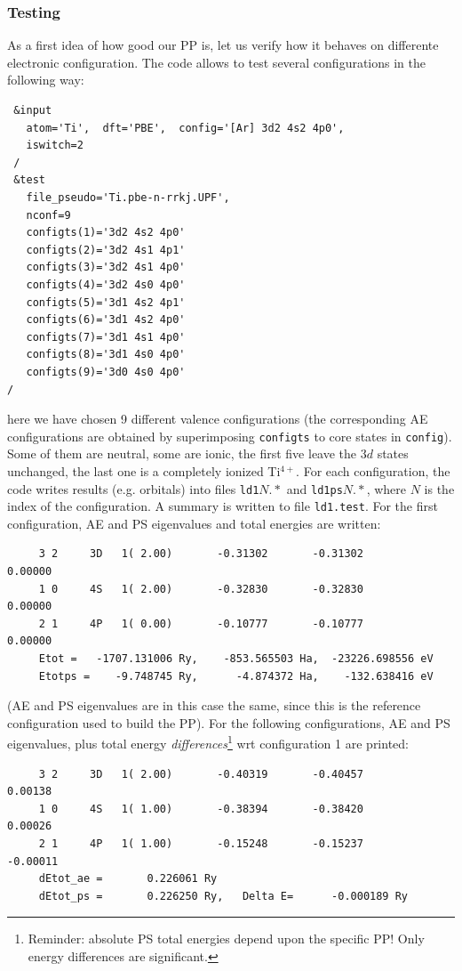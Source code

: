 \documentclass[12pt,a4paper]{article}
\begin{document}
\subsubsection{Testing}

As a first idea of how good our PP is, let us verify how it
behaves on differente electronic configuration. The code
allows to test several configurations in the following way:
\begin{verbatim}
 &input
   atom='Ti',  dft='PBE',  config='[Ar] 3d2 4s2 4p0',
   iswitch=2
 /
 &test
   file_pseudo='Ti.pbe-n-rrkj.UPF',
   nconf=9
   configts(1)='3d2 4s2 4p0'
   configts(2)='3d2 4s1 4p1'
   configts(3)='3d2 4s1 4p0'
   configts(4)='3d2 4s0 4p0'
   configts(5)='3d1 4s2 4p1'
   configts(6)='3d1 4s2 4p0'
   configts(7)='3d1 4s1 4p0'
   configts(8)='3d1 4s0 4p0'
   configts(9)='3d0 4s0 4p0'
/
\end{verbatim}
here we have chosen 9 different valence configurations 
(the corresponding AE configurations are obtained by 
superimposing \texttt{configts} to core states in \texttt{config}).
Some of them are neutral, some are ionic, the first five leave
the $3d$ states unchanged, the last one is a completely ionized
Ti$^{4+}$. For each configuration, the code writes results 
(e.g. orbitals) into files \texttt{ld1}$N.*$ and \texttt{ld1ps}$N.*$,
where $N$ is the index of the configuration. A summary is written to
file \texttt{ld1.test}. For the first configuration, AE and PS 
eigenvalues and total energies are written:
\begin{verbatim}
     3 2     3D   1( 2.00)       -0.31302       -0.31302        0.00000
     1 0     4S   1( 2.00)       -0.32830       -0.32830        0.00000
     2 1     4P   1( 0.00)       -0.10777       -0.10777        0.00000
     Etot =   -1707.131006 Ry,    -853.565503 Ha,  -23226.698556 eV
     Etotps =    -9.748745 Ry,      -4.874372 Ha,    -132.638416 eV
\end{verbatim}
(AE and PS eigenvalues are in this case the same, since this is the
reference configuration used to build the PP). For the following
configurations, AE and PS eigenvalues, plus total energy
{\em differences}\footnote{Reminder: absolute PS total energies 
depend upon the specific PP! Only energy differences are significant.}
wrt configuration 1 are printed:
\begin{verbatim}
     3 2     3D   1( 2.00)       -0.40319       -0.40457        0.00138
     1 0     4S   1( 1.00)       -0.38394       -0.38420        0.00026
     2 1     4P   1( 1.00)       -0.15248       -0.15237       -0.00011
     dEtot_ae =       0.226061 Ry
     dEtot_ps =       0.226250 Ry,   Delta E=      -0.000189 Ry
\end{verbatim}
\end{document}
